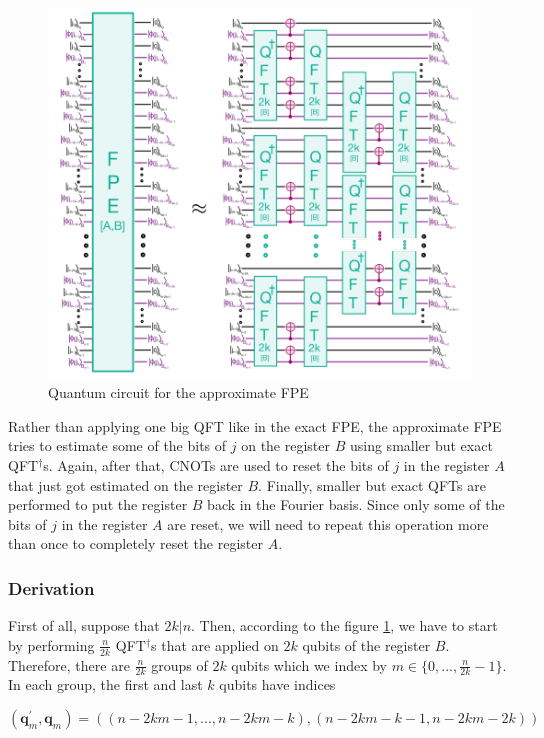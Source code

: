 \begin{figure}[H]
    \centering
    \includegraphics*[scale=0.55]{images/fpe.png}
    \caption{Quantum circuit for the approximate FPE}
    \label{circuit_fpe}
\end{figure}

Rather than applying one big QFT like in the exact FPE, the approximate FPE tries to estimate some of the bits of $j$ on the register $B$ using smaller but exact QFT$^{\dagger}$s. Again, after that, CNOTs are used to reset the bits of $j$ in the register $A$ that just got estimated on the register $B$. Finally, smaller but exact QFTs are performed to put the register $B$ back in the Fourier basis. Since only some of the bits of $j$ in the register $A$ are reset, we will need to repeat this operation more than once to completely reset the register $A$. 

\subsubsection{Derivation}
First of all, suppose that $2k|n$. Then, according to the figure \ref{circuit_fpe}, we have to start by performing $\frac{n}{2k}$ QFT$^{\dagger}$s that are applied on $2k$ qubits of the register $B$. Therefore, there are $\frac{n}{2k}$ groups of $2k$ qubits which we index by $m \in \{0, ..., \frac{n}{2k}-1\}$. In each group, the first and last $k$ qubits have indices 

\begin{equation*}
    (\textbf{q}^{'}_m, \textbf{q}_{m}) = \left(\left(n-2km-1, ..., n-2km-k\right), \left(n-2km-k-1, n-2km-2k\right)\right)
\end{equation*}

